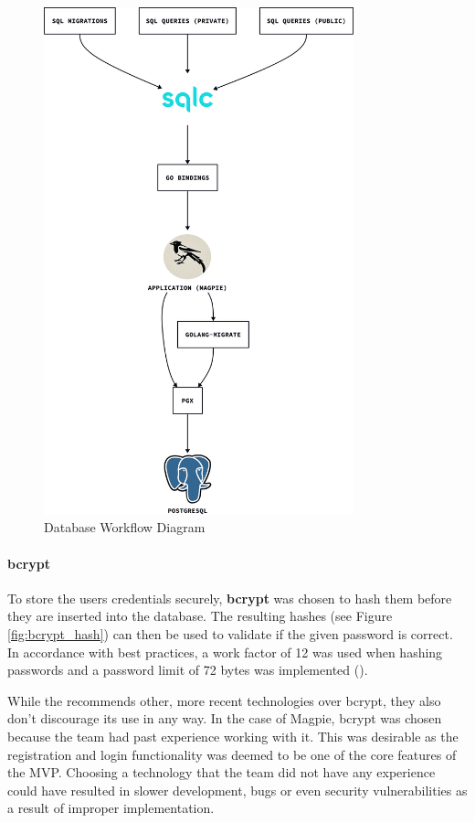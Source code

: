 \begin{figure}[htbp]
  \centering{}
  \includegraphics[width=0.8\textwidth]{../d2-diagrams/database-workflow/database_workflow.png}
  \caption{Database Workflow Diagram}
  \label{fig:database_workflow_diagram}
\end{figure}

\paragraph{bcrypt}
To store the users credentials securely, \textbf{bcrypt} was chosen to hash them
before they are inserted into the database. The resulting hashes (see Figure
\ref{fig:bcrypt_hash}) can then be used to validate if the given password is
correct. In accordance with best practices, a work factor of 12 was used when
hashing passwords and a password limit of 72 bytes was implemented
(\cite{owasp_password_storage_cheatsheet}).

While the \textcite{owasp_password_storage_cheatsheet} recommends other, more
recent technologies over bcrypt, they also don't discourage its use in any way.
In the case of Magpie, bcrypt was chosen because the team had past experience
working with it. This was desirable as the registration and login functionality
was deemed to be one of the core features of the MVP. Choosing a technology that
the team did not have any experience could have resulted in slower development,
bugs or even security vulnerabilities as a result of improper implementation.

